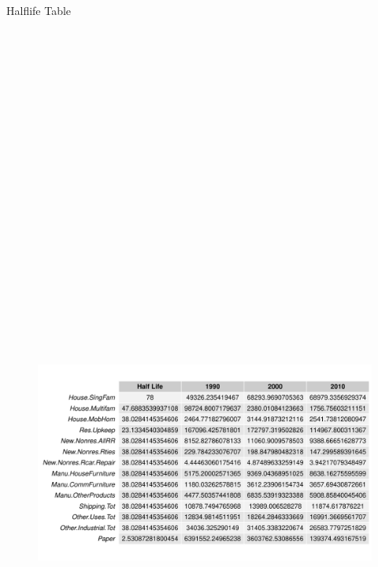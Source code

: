 \documentclass[final]{beamer}\usepackage[]{graphicx}\usepackage[]{color}
\newlength{\onecolwid}
\newlength{\twocolwid}
\begin{document}
\begin{frame}[t]
\begin{columns}[t]
\begin{column}{\twocolwid}
\begin{columns}[t,totalwidth=\twocolwid]
\begin{column}{\onecolwid}

\begin{block}{Halflife Table}
\begin{center}

\begin{figure}
    {\includegraphics[width=1\linewidth, height=37cm]{CopyOfHLTable2.pdf}}

\end{figure}
\end{center}
\end{block}
\end{column}
\end{columns}
\end{column}
\end{columns}
\end{frame}
\end{document}

